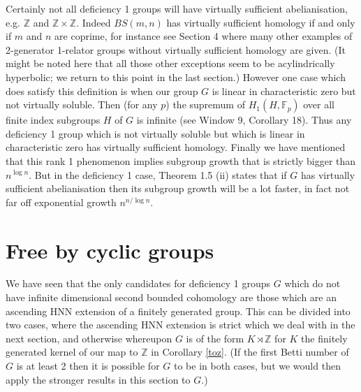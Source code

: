 \documentclass[11pt,reqno]{amsart}
\numberwithin{equation}{section}
\newcommand{\Z}{\mathbb{Z}}
\newcommand{\F}{\mathbb{F}}
\theoremstyle{definition}
\theoremstyle{remark}
\begin{document}
     Certainly not all deficiency 1 groups will have virtually sufficient
     abelianisation, e.g. $\Z$ and $\Z\times\Z$. Indeed $BS(m,n)$ has
     virtually sufficient homology if and only if $m$ and $n$ are coprime,
     for instance see \cite{me1r} Section 4
     where many other examples of 2-generator 1-relator
     groups without virtually sufficient homology are given. (It might be
     noted here that all those other exceptions seem to be acylindrically
     hyperbolic; we return to this point in the last section.)
          However one case which
     does satisfy this definition is when our group $G$ is linear in
     characteristic zero but not virtually soluble. Then (for any $p$)
     the supremum of $H_1(H,\F_p)$ over all finite index subgroups $H$
     of $G$ is infinite (see \cite{lssg} Window 9, Corollary 18). Thus any
     deficiency 1 group which is not virtually soluble but which is linear
     in characteristic zero has virtually sufficient homology.
     Finally
     we have mentioned that this rank 1 phenomenon implies subgroup growth
     that is strictly bigger than $n^{\log{n}}$. But in the deficiency
     1 case, \cite{lac} Theorem 1.5 (ii) states that if $G$ has virtually
     sufficient abelianisation then its subgroup growth will be a
     lot faster, in fact not far off exponential growth $n^{n/\log{n}}$.
     

     
     \section{Free by cyclic groups}

     We have seen that the only candidates for deficiency 1 groups $G$ which
     do not have infinite dimensional second bounded cohomology are
     those which are an ascending HNN extension of a finitely generated
     group. This can be divided into two cases, where the ascending HNN
     extension is strict which we deal with in the next section, and
     otherwise whereupon $G$ is of the form $K\rtimes\Z$ for $K$
     the finitely generated kernel of our map to $\Z$ in Corollary \ref{toz}.
     (If the first Betti number of $G$ is at least 2 then it is possible for
     $G$ to be in both cases, but we would then apply the stronger results
     in this section to $G$.)
     
\end{document}
